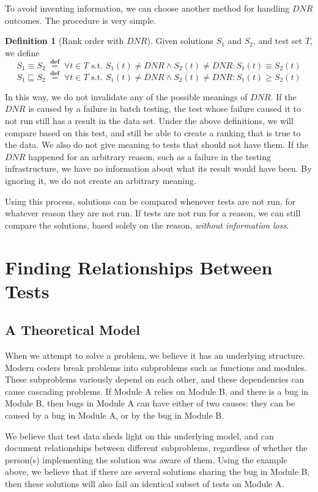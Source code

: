 \documentclass[11pt,twoside]{article}
\newcommand\dnr{\ensuremath{\mathit{DNR}}}
\newcommand\defined{\mathrel{\;\stackrel{\scriptscriptstyle\mathbf{def}}{=}\;}}
\theoremstyle{definition}
\newtheorem{defn}{Definition}
\begin{document}
To avoid inventing information, we can choose another method for handling $\dnr$ outcomes. The procedure is very simple.
\begin{defn}[Rank order with $\dnr$]
Given solutions $S_1$ and $S_2$, and test set $T$, we define
$$S_1 \equiv S_2 \defined \forall t \in T \mbox{ s.t. } S_1(t) \neq \dnr \wedge S_2(t) \neq \dnr : S_1(t) \equiv S_2(t)$$
$$S_1 \sqsubseteq S_2 \defined \forall t \in T \mbox{ s.t. } S_1(t) \neq \dnr \wedge S_2(t) \neq \dnr : S_1(t) \geq S_2(t)$$
\end{defn}
In this way, we do not invalidate any of the possible meanings of $\dnr$. If the $\dnr$ is caused by a failure in batch testing, the test whose failure caused it to not run still has a result in the data set. Under the above definitions, we will compare based on this test, and still be able to create a ranking that is true to the data. We also do not give meaning to tests that should not have them. If the $\dnr$ happened for an arbitrary reason, such as a failure in the testing infrastructure, we have no information about what its result would have been. By ignoring it, we do not create an arbitrary meaning. 

Using this process, solutions can be compared whenever tests are not run, for whatever reason they are not run. If tests are not run for a reason, we can still compare the solutions, based solely on the reason, \emph{without information loss}.

\section{Finding Relationships Between Tests}
\subsection{A Theoretical Model}
When we attempt to solve a problem, we believe it has an underlying structure. Modern coders break problems into subproblems such as functions and modules. These subproblems variously depend on each other, and these dependencies can cause cascading problems. If Module A relies on Module B, and there is a bug in Module B, then bugs in Module A can have either of two causes: they can be caused by a bug in Module A, or by the bug in Module B.

We believe that test data sheds light on this underlying model, and can document relationships between different subproblems, regardless of whether the person(s) implementing the solution was aware of them. Using the example above, we believe that if there are several solutions sharing the bug in Module B, then these solutions will also fail an identical subset of tests on Module A.
\end{document}
